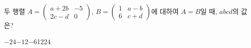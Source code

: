 \hspace*{2mm}\begin{minipage}[t]{\dimexpr\linewidth-2mm\relax}\vspace{0pt}
두 행렬 $A=\begin{pmatrix} a+2b & -5 \\ 2c-d & 0 \end{pmatrix}$, $B=\begin{pmatrix} 1 & a-b \\ 6 & c+d \end{pmatrix}$에 대하여 $A=B$일 때, $abcd$의 값은? 
\begin{choices32}{$-24$}{$-12$}{$-6$}{12}{24}\end{choices32}\end{minipage}
